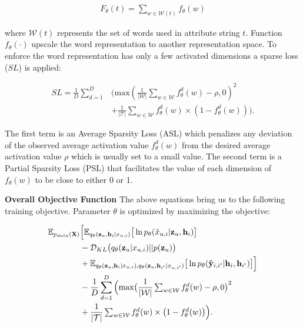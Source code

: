 \begin{equation}
\begin{aligned}
F_{\theta}(t) = \sum_{w \in \mathcal{W}(t)} f_{\theta}(w)
\end{aligned}
\end{equation}

where $\mathcal{W}(t)$ represents the set of words used in attribute string $t$. Function $f_{\theta}(\cdot)$ upscale the word representation to another representation space. To enforce the word representation has only a few activated dimensions a sparse loss ($\textit{SL}$) is applied:

\begin{equation}
\begin{aligned}
\textit{SL} = \frac{1}{D} \sum_{d=1}^D &\Big( \text{max}  (\frac{1}{|\mathcal{W}|} \sum_{w \in \mathcal{W}} f^{d}_{\theta}(w) - \rho, 0) ^2 \\
&+ \frac{1}{|\mathcal{T}|} \sum_{w \in \mathcal{W}}  f^{d}_{\theta}(w) \times (1- f^{d}_{\theta}(w))  \Big).
\label{equ:sparseloss}
\end{aligned}
\end{equation}

The first term is an Average Sparsity Loss (ASL) which penalizes any deviation of the observed average activation value $f^{d}_{\theta}(w)$ from the desired average activation value $\rho$ which is usually set to a small value. The second term is a Partial Sparsity Loss (PSL) that facilitates the value of each dimension of $f_{\theta}(w)$ to be close to either 0 or 1\cite{Subramanian18SPINE}.

\textbf{Overall Objective Function} The above equations bring us to the following training objective. Parameter $\theta$ is optimized by maximizing the objective:

\begin{equation}
\begin{split}
\mathbb{E}_{ p_{data}(\mathbf{X})} & \Big[ \mathbb{E}_{q_{\theta}{(\mathbf{z}_{u}, \mathbf{h}_{i}|x_{u,i}})} \big[\ln p_{\theta}(\Tilde{x}_{u,i} |\mathbf{z}_{u}, \mathbf{h}_{i})\big] \\
& - \mathcal{D}_{KL}\big(q_{\theta}(\mathbf{z}_{u}|{x}_{u,i})||p(\mathbf{z}_{u})\big) \\
&+ \mathbb{E}_{q_{\theta}{(\mathbf{z}_{u}, \mathbf{h}_{i}|{x}_{u,i}}), q_{\theta}{(\mathbf{z}_{u}, \mathbf{h}_{i'}|{x}_{u,i'}})} \big[\ln p_{\theta}(\mathbf{\Tilde{y}}_{i,i'} |\mathbf{h}_{i}, \mathbf{h}_{i'})\big] \Big] \\
&-\frac{1}{D} \sum_{d=1}^D \Big( \text{max}  \big(\frac{1}{|\mathcal{W}|} \textstyle\sum_{w \in \mathcal{W}} f^{d}_{\theta}(w) - \rho, 0\big)^2 \\
&+ \frac{1}{|\mathcal{T}|} \textstyle\sum_{w \in \mathcal{W}}  f^{d}_{\theta}(w) \times \big(1- f^{d}_{\theta}(w) \big)  \Big).
\end{split}
\label{equ:whole_obj}
\end{equation}



